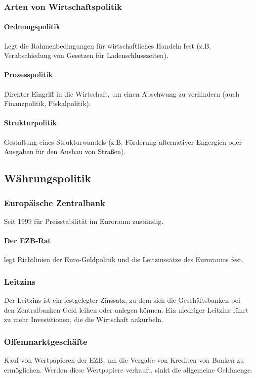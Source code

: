 \documentclass{article}
\begin{document}
	\subsubsection{Arten von Wirtschaftspolitik}

	\paragraph{Ordnungspolitik}
	Legt die Rahmenbedingungen für wirtschaftliches Handeln fest (z.B. Verabschiedung von Gesetzen für Ladenschlusszeiten).

	\paragraph{Prozesspolitik}
	Direkter Eingriff in die Wirtschaft, um einen Abschwung zu verhindern (auch Finanzpolitik, Fiskalpolitik).

	\paragraph{Strukturpolitik}
	Gestaltung eines Strukturwandels (z.B. Förderung alternativer Engergien oder Ausgaben für den Ausbau von Straßen).

	\subsection{Währungspolitik}

	\subsubsection{Europäische Zentralbank}
	Seit 1999 für Preisstabilität im Euroraum zuständig.

	\paragraph{Der EZB-Rat}
	legt Richtlinien der Euro-Geldpolitik und die Leitzinssätze des Euroraums fest.

	\subsubsection{Leitzins}
	Der Leitzins ist ein festgelegter Zinssatz, zu dem sich die Geschäftsbanken bei den Zentralbanken Geld leihen oder anlegen können. Ein niedriger Leitzins führt zu mehr Investitionen, die die Wirtschaft ankurbeln.

	\subsubsection{Offenmarktgeschäfte}
	Kauf von Wertpapieren der EZB, um die Vergabe von Krediten von Banken zu ermöglichen. Werden diese Wertpapiere verkauft, sinkt die allgemeine Geldmenge.
\end{document}

